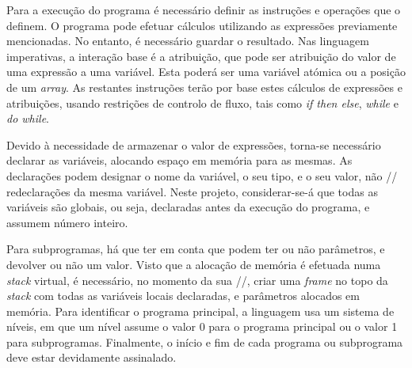 Para a execução do programa é necessário definir as instruções e operações que
o definem. O programa pode efetuar cálculos utilizando as expressões previamente
mencionadas. No entanto, é necessário guardar o resultado. Nas linguagem
imperativas, a interação base é a atribuição, que pode ser atribuição do valor
de uma expressão a uma variável. Esta poderá ser uma variável atómica ou
a posição de um \emph{array}.  As restantes instruções terão por base estes
cálculos de expressões e atribuições, usando restrições de controlo de fluxo,
tais como \emph{if then else}, \emph{while} e \emph{do while}.

Devido à necessidade de armazenar o valor de expressões, torna-se necessário 
declarar as variáveis, alocando espaço em memória para as mesmas. As declarações 
podem designar o nome da variável, o seu tipo, e o seu valor, não // redeclarações 
da mesma variável. Neste projeto, considerar-se-á que todas as variáveis são globais, 
ou seja, declaradas antes da execução do programa, e assumem número inteiro.   

Para subprogramas, há que ter em conta que podem ter ou não parâmetros,
e devolver ou não um valor. Visto que a alocação de memória é efetuada numa
\emph{stack} virtual, é necessário, no momento da sua //, criar uma \emph{frame}
no topo da \emph{stack} com todas as variáveis locais declaradas, e parâmetros
alocados em memória. Para identificar o programa principal, a linguagem usa um
sistema de níveis, em que um nível assume o valor 0 para o programa principal ou
o valor 1 para subprogramas. Finalmente, o início e fim de cada programa ou
subprograma deve estar devidamente assinalado.  





